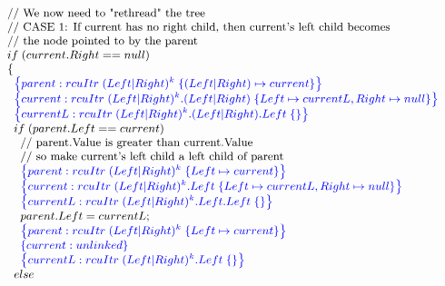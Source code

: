 \[\small
\begin{array}{@{}l@{}}
    \;\;\text{// We now need to "rethread" the tree}\\
    \;\;\text{// CASE 1: If current has no right child, then current's left child becomes}\\
    \;\;\text{//         the node pointed to by the parent}\\
    \;\;if\; (current.Right == null)\\
    \;\;\{\\
        \;\;\;\;\specline{parent:rcuItr\; (Left|Right)^{k} \; \{ (Left|Right) \mapsto current\} }\\
        \;\;\;\;\specline{current:rcuItr\; (Left|Right)^{k}.(Left|Right) \; \{Left\mapsto currentL , Right \mapsto null\} }\\
        \;\;\;\;\specline{currentL:rcuItr\; (Left|Right)^{k}.(Left|Right).Left \; \{\} }\\
        
            \;\;\;\;if\; (parent.Left == current)\\
                \;\;\;\;\;\;\text{// parent.Value is greater than current.Value}\\
                \;\;\;\;\;\;\text{// so make current's left child a left child of parent}\\
                \;\;\;\;\;\;\specline{parent:rcuItr\; (Left|Right)^{k} \; \{ Left \mapsto current\} }\\
                \;\;\;\;\;\;\specline{current:rcuItr\; (Left|Right)^{k}.Left \; \{Left\mapsto currentL, Right\mapsto null\} }\\
                \;\;\;\;\;\;\specline{currentL:rcuItr\; (Left|Right)^{k}.Left.Left \; \{\} }\\
                \;\;\;\;\;\;parent.Left = currentL;\\
                \;\;\;\;\;\;\specline{parent:rcuItr\; (Left|Right)^{k} \; \{ Left \mapsto current\} }\\
                \;\;\;\;\;\;\specline{current:unlinked}\\
                \;\;\;\;\;\;\specline{currentL:rcuItr\; (Left|Right)^{k}.Left \; \{\} }\\
                
            \;\;\;\;else \\


\end{array}\]
